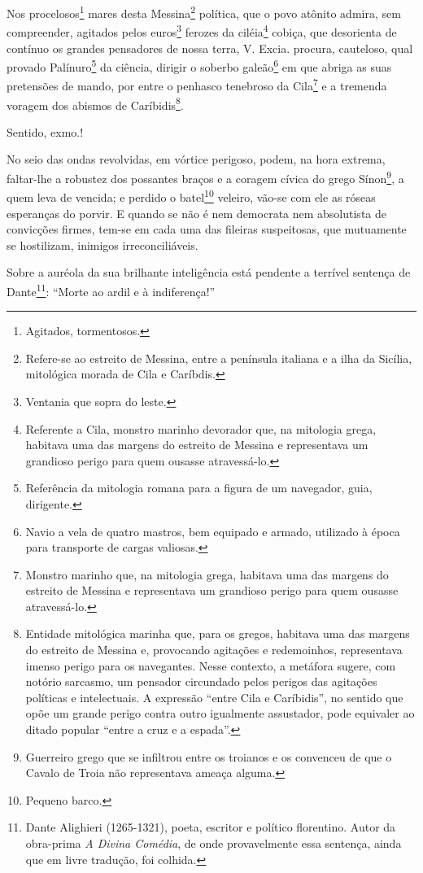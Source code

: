 Nos procelosos\footnote{Agitados, tormentosos.} mares desta
Messina\footnote{Refere-se ao estreito de Messina, entre a península
  italiana e a ilha da Sicília, mitológica morada de Cila e Caríbdis.}
política, que o povo atônito admira, sem compreender, agitados pelos
euros\footnote{Ventania que sopra do leste.} ferozes da
ciléia\footnote{Referente a Cila, monstro marinho devorador que, na
  mitologia grega, habitava uma das margens do estreito de Messina e
  representava um grandioso perigo para quem ousasse atravessá-lo.}
cobiça, que desorienta de contínuo os grandes pensadores de nossa terra,
V. Excia. procura, cauteloso, qual provado Palínuro\footnote{
  Referência da mitologia romana para a figura de um navegador, guia,
  dirigente.} da ciência, dirigir o soberbo galeão\footnote{Navio a
  vela de quatro mastros, bem equipado e armado, utilizado à época para
  transporte de cargas valiosas.} em que abriga as suas pretensões de
mando, por entre o penhasco tenebroso da Cila\footnote{Monstro marinho
  que, na mitologia grega, habitava uma das margens do estreito de
  Messina e representava um grandioso perigo para quem ousasse
  atravessá-lo.} e a tremenda voragem dos abismos de
Caríbidis\footnote{Entidade mitológica marinha que, para os gregos,
  habitava uma das margens do estreito de Messina e, provocando
  agitações e redemoinhos, representava imenso perigo para os
  navegantes. Nesse contexto, a metáfora sugere, com notório sarcasmo,
  um pensador circundado pelos perigos das agitações políticas e
  intelectuais. A expressão ``entre Cila e Caríbidis'', no sentido que
  opõe um grande perigo contra outro igualmente assustador, pode
  equivaler ao ditado popular ``entre a cruz e a espada''.}.

Sentido, exmo.!

No seio das ondas revolvidas, em vórtice perigoso, podem, na hora
extrema, faltar-lhe a robustez dos possantes braços e a coragem cívica
do grego Sínon\footnote{Guerreiro grego que se infiltrou entre os
  troianos e os convenceu de que o Cavalo de Troia não representava
  ameaça alguma.}, a quem leva de vencida; e perdido o batel\footnote{
  Pequeno barco.} veleiro, vão-se com ele as róseas esperanças do
porvir. E quando se não é nem democrata nem absolutista de convicções
firmes, tem-se em cada uma das fileiras suspeitosas, que mutuamente se
hostilizam, inimigos irreconciliáveis.

Sobre a auréola da sua brilhante inteligência está pendente a terrível
sentença de Dante\footnote{Dante Alighieri (1265-1321), poeta,
  escritor e político florentino. Autor da obra-prima \emph{A Divina
  Comédia}, de onde provavelmente essa sentença, ainda que em livre
  tradução, foi colhida.}: ``Morte ao ardil e à indiferença!''

